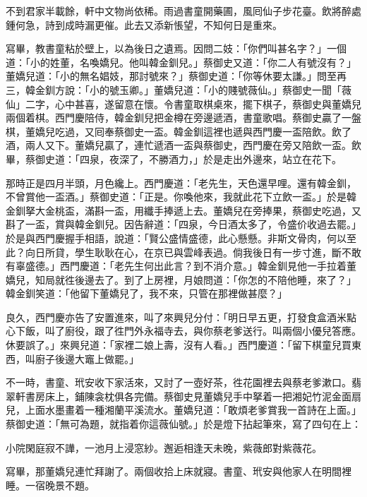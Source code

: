 不到君家半載餘，軒中文物尚依稀。雨過書童開藥圃，風囘仙子步花臺。飲將醉處鍾何急，詩到成時漏更催。此去又添新悵望，不知何日是重來。

寫畢，教書童粘於壁上，以為後日之遺焉。因問二妓：「你們叫甚名字？」一個道：「小的姓董，名喚嬌兒。他叫韓金釧兒。」蔡御史又道：「你二人有號沒有？」董嬌兒道：「小的無名娼妓，那討號來？」蔡御史道：「你等休要太謙。」問至再三，韓金釧方說：「小的號玉卿。」董嬌兒道：「小的賤號薇仙。」{}蔡御史一聞「薇仙」二字，心中甚喜，遂留意在懷。令書童取棋桌來，擺下棋子，蔡御史與董嬌兒兩個着棋。西門慶陪侍，韓金釧兒把金樽在旁邊遞酒，書童歌唱。蔡御史贏了一盤棋，董嬌兒吃過，又囘奉蔡御史一盃。韓金釧這裡也遞與西門慶一盃陪飲。飲了酒，兩人又下。董嬌兒贏了，連忙遞酒一盃與蔡御史，西門慶在旁又陪飲一盃。飲畢，蔡御史道：「四泉，夜深了，不勝酒力，」於是走出外邊來，站立在花下。

那時正是四月半頭，月色纔上。西門慶道：「老先生，天色還早哩。還有韓金釧，不曾賞他一盃酒。」蔡御史道：「正是。你喚他來，我就此花下立飲一盃。」於是韓金釧拏大金桃盃，滿斟一盃，用纖手捧遞上去。董嬌兒在旁捧果，蔡御史吃過，又斟了一盃，賞與韓金釧兒。因告辭道：「四泉，今日酒太多了，令盛价收過去罷。」於是與西門慶握手相語，說道：「賢公盛情盛德，此心懸懸。非斯文骨肉，何以至此？向日所貸，學生耿耿在心，在京已與雲峰表過。倘我後日有一步寸進，斷不敢有辜盛德。」西門慶道：「老先生何出此言？到不消介意。」韓金釧見他一手拉着董嬌兒，知局就徃後邊去了。到了上房裡，月娘問道：「你怎的不陪他睡，來了？」韓金釧笑道：「他留下董嬌兒了，我不來，只管在那裡做甚麼？」

良久，西門慶亦告了安置進來，叫了來興兒分付：「明日早五更，打發食盒酒米點心下飯，叫了廚役，跟了徃門外永福寺去，與你蔡老爹送行。叫兩個小優兒答應。休要誤了。」來興兒道：「家裡二娘上壽，沒有人看。」西門慶道：「留下棋童兒買東西，叫廚子後邊大竈上做罷。」

不一時，書童、玳安收下家活來，又討了一壺好茶，徃花園裡去與蔡老爹漱口。翡翠軒書房床上，鋪陳衾枕俱各完備。蔡御史見董嬌兒手中拏着一把湘妃竹泥金面扇兒，上面水墨畫着一種湘蘭平溪流水。董嬌兒道：「敢煩老爹賞我一首詩在上面。」蔡御史道：「無可為題，就指着你這薇仙號。」於是燈下拈起筆來，寫了四句在上：

小院閑庭寂不譁，一池月上浸窓紗。邂逅相逢天未晚，紫薇郎對紫薇花。

寫畢，那董嬌兒連忙拜謝了。兩個收拾上床就寢。書童、玳安與他家人在明間裡睡。一宿晚景不題。

